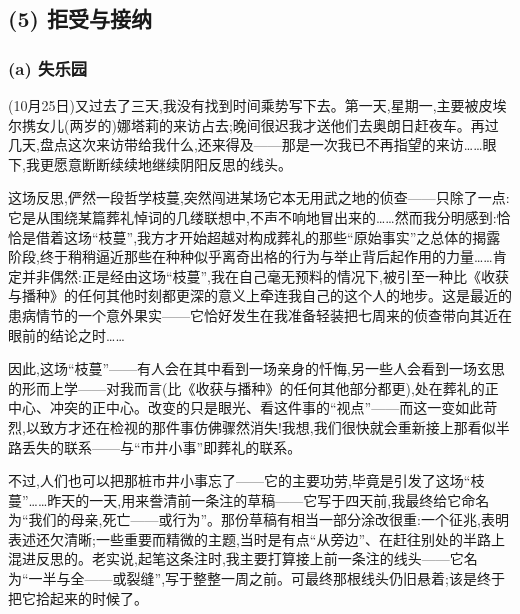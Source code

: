 \subsection{(5) 拒受与接纳}
\label{ch18:local:h21}

\subsubsection*{(a) 失乐园}
\label{ch18:local:h22}

\label{ch18:local:n19}

\dmark{}(10月25日)又过去了三天,我没有找到时间乘势写下去。第一天,星期一,主要被皮埃尔携女儿(两岁的)娜塔莉的来访占去;晚间很迟我才送他们去奥朗日赶夜车。再过几天,盘点这次来访带给我什么,还来得及——那是一次我已不再指望的来访……眼下,我更愿意断断续续地继续阴阳反思的线头。

这场反思,俨然一段哲学枝蔓,突然闯进某场它本无用武之地的侦查——只除了一点:它是从围绕某篇葬礼悼词的几缕联想中,不声不响地冒出来的……然而我分明感到:恰恰是借着这场“枝蔓”,我方才开始超越对构成葬礼的那些“原始事实”之总体的揭露阶段,终于稍稍逼近那些在种种似乎离奇出格的行为与举止背后起作用的力量……肯定并非偶然:正是经由这场“枝蔓”,我在自己毫无预料的情况下,被引至一种比《收获与播种》的任何其他时刻都更深的意义上牵连我自己的这个人的地步。这是最近的患病情节的一个意外果实——它恰好发生在我准备轻装把七周来的侦查带向其近在眼前的结论之时……

因此,这场“枝蔓”——有人会在其中看到一场亲身的忏悔,另一些人会看到一场玄思的形而上学——对我而言(比《收获与播种》的任何其他部分都更),处在葬礼的正中心、冲突的正中心。改变的只是眼光、看这件事的“视点”——而这一变如此苛烈,以致方才还在检视的那件事仿佛骤然消失!我想,我们很快就会重新接上那看似半路丢失的联系——与“市井小事”即葬礼的联系。

不过,人们也可以把那桩市井小事忘了——它的主要功劳,毕竟是引发了这场“枝蔓”……昨天的一天,用来誊清前一条注的草稿——它写于四天前,我最终给它命名为“我们的母亲,死亡——或行为”。那份草稿有相当一部分涂改很重:一个征兆,表明表述还欠清晰;一些重要而精微的主题,当时是有点“从旁边”、在赶往别处的半路上混进反思的。老实说,起笔这条注时,我主要打算接上前一条注的线头——它名为“一半与全——或裂缝”,写于整整一周之前。可最终那根线头仍旧悬着;该是终于把它拾起来的时候了。

